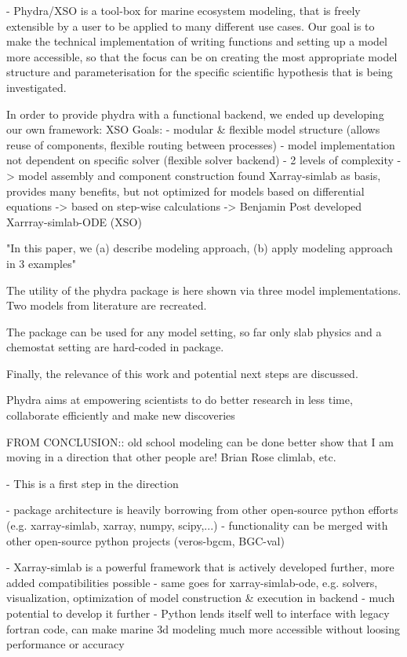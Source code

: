 \documentclass[journal abbreviation, manuscript]{copernicus}
\begin{document}
- Phydra/XSO is a tool-box for marine ecosystem modeling, that is freely extensible by a user to be applied to many different use cases. Our goal is to make the technical implementation of writing functions and setting up a model more accessible, so that the focus can be on creating the most appropriate model structure and parameterisation for the specific scientific hypothesis that is being investigated. 

In order to provide phydra with a functional backend, we ended up developing our own framework: XSO
Goals:
- modular \& flexible model structure (allows reuse of components, flexible routing between processes)
- model implementation not dependent on specific solver (flexible solver backend)
- 2 levels of complexity -> model assembly and component construction
found Xarray-simlab as basis, provides many benefits, but not optimized for models based on differential equations -> based on step-wise calculations
-> Benjamin Post developed Xarrray-simlab-ODE (XSO) 


"In this paper, we (a) describe modeling approach, (b) apply modeling approach in 3 examples"

The utility of the phydra package is here shown via three model implementations. Two models from literature are recreated.

The package can be used for any model setting, so far only slab physics and a chemostat setting are hard-coded in package.

Finally, the relevance of this work and potential next steps are discussed.

Phydra aims at empowering scientists to do better research in less time, collaborate efficiently and make new discoveries





FROM CONCLUSION::
old school modeling can be done better
show that I am moving in a direction that other people are! Brian Rose climlab, etc.

- This is a first step in the direction

- package architecture is heavily borrowing from other open-source python efforts (e.g. xarray-simlab, xarray, numpy, scipy,...) 
- functionality can be merged with other open-source python projects (veros-bgcm, BGC-val)

- Xarray-simlab is a powerful framework that is actively developed further, more added compatibilities possible
- same goes for xarray-simlab-ode, e.g. solvers, visualization, optimization of model construction \& execution in backend - much potential to develop it further
- Python lends itself well to interface with legacy fortran code, can make marine 3d modeling much more accessible without loosing performance or accuracy
\end{document}
